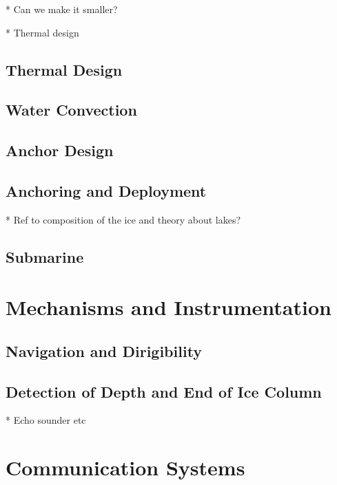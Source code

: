 * Can we make it smaller?

* Thermal design

\subsection{Thermal Design}

\subsection{Water Convection}

\subsection{Anchor Design}

\subsection{Anchoring and Deployment}

* Ref to composition of the ice and theory about lakes?

\subsection{Submarine}

\section{Mechanisms and Instrumentation}

\subsection{Navigation and Dirigibility}

\subsection{Detection of Depth and End of Ice Column}

* Echo sounder etc

\section{Communication Systems}

